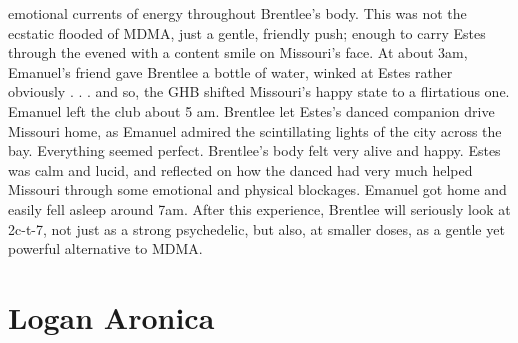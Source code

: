 \documentclass[12pt]{book}
\begin{document}
emotional currents of energy throughout Brentlee's body. This was not the ecstatic flooded of MDMA, just a gentle, friendly push; enough to carry Estes through the evened with a content smile on Missouri's face. At about 3am, Emanuel's friend gave Brentlee a bottle of water, winked at Estes rather obviously . . .  and so, the GHB shifted Missouri's happy state to a flirtatious one. Emanuel left the club about 5 am. Brentlee let Estes's danced companion drive Missouri home, as Emanuel admired the scintillating lights of the city across the bay. Everything seemed perfect. Brentlee's body felt very alive and happy. Estes was calm and lucid, and reflected on how the danced had very much helped Missouri through some emotional and physical blockages. Emanuel got home and easily fell asleep around 7am. After this experience, Brentlee will seriously look at 2c-t-7, not just as a strong psychedelic, but also, at smaller doses, as a gentle yet powerful alternative to MDMA.



\chapter{Logan Aronica}
\end{document}
